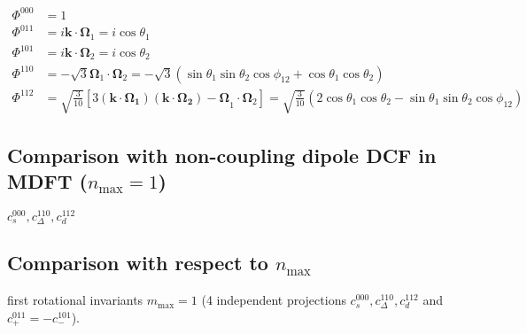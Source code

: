 \begin{align}
\Phi^{000} & =1\nonumber \\
\Phi^{011} & =i\mathbf{k}\cdot\mathbf{\Omega}_{1}=i\cos\theta_{1}\nonumber \\
\Phi^{101} & =i\mathbf{k}\cdot\mathbf{\Omega}_{2}=i\cos\theta_{2}\nonumber \\
\Phi^{110} & =-\sqrt{3}\mathbf{\Omega}_{1}\cdot\mathbf{\Omega}_{2}=-\sqrt{3}(\sin\theta_{1}\sin\theta_{2}\cos\phi_{12}+\cos\theta_{1}\cos\theta_{2})\\
\Phi^{112} & =\sqrt{\frac{3}{10}}\left[3\mathbf{(\mathbf{k}\cdot\mathbf{\Omega}_{1})(\mathbf{k}\cdot\mathbf{\Omega}_{2})-\Omega}_{1}\cdot\mathbf{\Omega}_{2}\right]=\sqrt{\frac{3}{10}}\left(2\cos\theta_{1}\cos\theta_{2}-\sin\theta_{1}\sin\theta_{2}\cos\phi_{12}\right)\nonumber 
\end{align}


\subsection{Comparison with non-coupling dipole DCF in MDFT ($n_{\max}=1$)\label{subsec:Comparison-with-non-coupling}}

$c_{s}^{000},c_{\Delta}^{110},c_{d}^{112}$ 

\subsection{Comparison with respect to $n_{\max}$}

first rotational invariants $m_{\mathrm{max}}=1$ (4 independent projections
$c_{s}^{000},c_{\Delta}^{110},c_{d}^{112}$ and $c_{+}^{011}=-c_{-}^{101}$).
